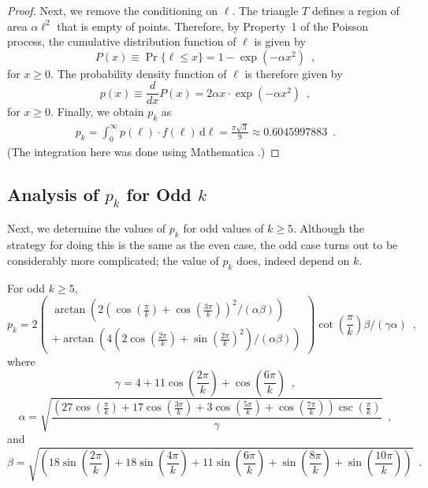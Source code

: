 \documentclass{patmorin}
\begin{document}
\begin{proof}
  Next, we remove the conditioning on $\ell$.  The triangle $T$ defines a
  region of area $\alpha\ell^2$ that is empty of points.  Therefore,
  by Property~1 of the Poisson process, the cumulative distribution
  function of $\ell$ is given by
  \[
    P(x) \equiv \Pr\{\ell \le x\} = 1-\exp(-\alpha x^2) \enspace ,
  \]
  for $x\ge 0$. The probability density function of $\ell$ is therefore 
  given by 
  \[
     p(x) \equiv \frac{d}{dx}P(x) =
     2\alpha x\cdot\exp(-\alpha x^2) \enspace ,
  \]
  for $x\ge 0$.  Finally, we obtain $p_k$ as
  \begin{align*}
     p_k = \int_0^\infty p(\ell)\cdot f(\ell)\,\mathrm{d}\ell 
     = \frac{\pi\sqrt{3}}{9}
      \approx 0.6045997883  \enspace . 
  \end{align*}
  (The integration here was done using Mathematica \cite{morin:avgtheta}.)
\end{proof}


\subsection{Analysis of $p_k$ for Odd $k$}

Next, we determine the values of $p_k$ for odd values of $k\ge 5$.
Although the strategy for doing this is the same as the even case,
the odd case turns out to be considerably more complicated; the value
of $p_k$ does, indeed depend on $k$.

\noindent
\begin{minipage}{\textwidth}
\begin{lem}
  For odd $k\ge 5$,
\[
p_k = 
2
\left(\begin{array}{l}
  \arctan\left(
     2\left(\cos\left(\frac{\pi }{k}\right)
       +\cos\left(\frac{3 \pi }{k}\right)\right)^2 / (\alpha\beta) 
  \right) \\
   + \arctan\left(
       4 \left(2 \cos\left(\frac{2 \pi }{k}\right)
       +\sin\left(\frac{2 \pi }{k}\right)^2\right)/(\alpha\beta) 
     \right)
  \end{array}
\right)
\cot\left(\frac{\pi }{k}\right) 
\beta
/
\left(\gamma \alpha\right)\enspace ,
\]
where
\[
\gamma =4+11 \cos\left(\frac{2 \pi }{k}\right)+\cos\left(\frac{6 \pi }{k}\right) \enspace ,
\]
\[
\alpha = 
\sqrt{\frac{\left(27 \cos\left(\frac{\pi }{k}\right)+17 \cos\left(\frac{3 \pi }{k}\right)+3 \cos\left(\frac{5 \pi }{k}\right)+\cos\left(\frac{7 \pi }{k}\right)\right) \csc\left(\frac{\pi }{k}\right)}{\gamma}} \enspace ,
\]
and
\[
\beta = \sqrt{\left(18 \sin\left(\frac{2 \pi }{k}\right)+18 \sin\left(\frac{4 \pi }{k}\right)+11 \sin\left(\frac{6 \pi }{k}\right)+\sin\left(\frac{8 \pi }{k}\right)+\sin\left(\frac{10 \pi }{k}\right)\right)} \enspace .
\]
\end{lem}
\end{minipage}
\end{document}

